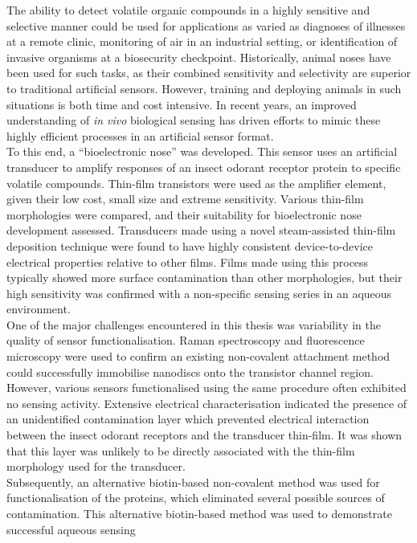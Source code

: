 \documentclass[
  a4paper,
]{scrbook}
\begin{document}
\begin{spacing}{1.2}
The ability to detect volatile organic compounds in a highly sensitive and selective manner could be used for applications as varied as diagnoses of illnesses at a remote clinic, monitoring of air in an industrial setting, or identification of invasive organisms at a biosecurity checkpoint. Historically, animal noses have been used for such tasks, as their combined sensitivity and selectivity are superior to traditional artificial sensors. However, training and deploying animals in such situations is both time and cost intensive. In recent years, an improved understanding of \textit{in vivo} biological sensing has driven efforts to mimic these highly efficient processes in an artificial sensor format. \\[5pt] To this end, a ``bioelectronic nose'' was developed. This sensor uses an artificial transducer to amplify responses of an insect odorant receptor protein to specific volatile compounds. Thin-film transistors were used as the amplifier element, given their low cost, small size and extreme sensitivity. Various thin-film morphologies were compared, and their suitability for bioelectronic nose development assessed. Transducers made using a novel steam-assisted thin-film deposition technique were found to have highly consistent device-to-device electrical properties relative to other films. Films made using this process typically showed more surface contamination than other morphologies, but their high sensitivity was confirmed with a non-specific sensing series in an aqueous environment. \\[5pt] One of the major challenges encountered in this thesis was variability in the quality of sensor functionalisation. Raman spectroscopy and fluorescence microscopy were used to confirm an existing non-covalent attachment method could successfully immobilise nanodiscs onto the transistor channel region. However, various sensors functionalised using the same procedure often exhibited no sensing activity. Extensive electrical characterisation indicated the presence of an unidentified contamination layer which prevented electrical interaction between the insect odorant receptors and the transducer thin-film. It was shown that this layer was unlikely to be directly associated with the thin-film morphology used for the transducer. \\[5pt] Subsequently, an alternative biotin-based non-covalent method was used for functionalisation of the proteins, which eliminated several possible sources of contamination. This alternative biotin-based method was used to demonstrate successful aqueous sensing \newpage

\end{spacing}
\end{document}
